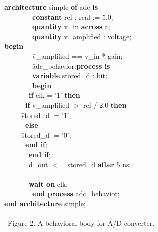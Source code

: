{\small
\begin{tabbing}
\ \ \ \= \textbf{architecture} simple \textbf{of} adc \textbf{is} \\
\> \ \ \ \ \ \ \ \ \ \ \ \= \textbf{constant} ref : real := 5.0; \\
\> \ \ \ \ \ \ \ \ \ \ \ \= \textbf{quantity} v\_in \textbf{across} a; \\
\> \ \ \ \ \ \ \ \ \ \ \ \= \textbf{quantity} v\_amplified : voltage; \\
\ \ \ \= \textbf{begin} \\
\> \ \ \ \ \ \ \ \ \ \ \ \= v\_amplified == v\_in * gain; \\
\> \ \ \ \ \ \ \ \ \ \ \ \= adc\_behavior:\textbf{process is} \\
\> \ \ \ \ \ \ \ \ \ \ \ \= \textbf{variable} stored\_d : bit; \\
\> \ \ \ \ \ \ \ \ \ \ \ \= \textbf{begin} \\
\> \> \ \ \ \ \ \ \ \ \ \ \= \textbf{if} clk = '1' \textbf{then} \\
\> \> \> \ \ \ \ \ \ \ \ \ \= \textbf{if} v\_amplified $>$ ref / 2.0 \textbf{then} \\
\> \> \> \> \ \ \ \ \ \ \ \ \= stored\_d := '1'; \\
\> \> \> \ \ \ \ \ \ \ \ \ \= \textbf{else} \\
\> \> \> \> \ \ \ \ \ \ \ \ \= stored\_d := '0'; \\
\> \> \> \ \ \ \ \ \ \ \ \ \= \textbf{end if}; \\
\> \> \ \ \ \ \ \ \ \ \ \ \=\textbf{end if};\\
\> \> \ \ \ \ \ \ \ \ \ \ \= d\_out $<$= stored\_d \textbf{after} 5 ns;\\ \\
\> \> \ \ \ \ \ \ \ \ \ \ \= \textbf{wait on} clk;\\
\> \ \ \ \ \ \ \ \ \ \ \ \= \textbf{end process} adc\_behavior;\\
\ \ \ \= \textbf{end architecture} simple;
\ \ \ \     \\
\ \ \ \     \\
\ \ \ \ Figure 2. A behavioral \arch body for A/D converter.
\end{tabbing}
}





